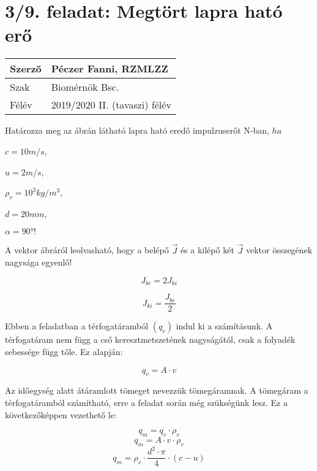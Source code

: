 \section*{3/9. feladat: Megtört lapra ható erő}
\begin{tabular}{ | p{2cm} | p{14cm} | } 
	\hline 
	Szerző & Péczer Fanni, RZMLZZ \\
	\hline
	Szak & Biomérnök Bsc. \\
	\hline	Félév & 2019/2020 II. (tavaszi) félév  \\
	\hline
\end{tabular}
\vspace{0.5cm}

\noindent Határozza meg az ábrán látható lapra ható eredő impulzuserőt N-ban, $ha$

$c= 10 m/s$,

$u= 2 m/s$,

$\rho_v=10^3 kg/m^3$,

$d=20 mm$,

$\alpha=90°!$



\noindent\hrulefill


\noindent A vektor ábráról leolvasható, hogy a belépő $\vec{J}$ és a kilépő két $\vec{J}$ vektor összegének nagysága egyenlő!

\begin{equation}
J_{be} = 2 J_{ki}
\end{equation}

\begin{equation}
J_{ki} = \frac{J_{be}}{2}
\end{equation}

\noindent Ebben a feladatban a térfogatáramból $(q_v)$ indul ki a számításunk. A térfogatáram nem függ a cső keresztmetszetének nagyságától, csak a folyadék sebessége függ tőle. Ez alapján:

\begin{equation}
q_v=A\cdot{v}
\end{equation}

\noindent Az időegység alatt átáramlott tömeget nevezzük tömegáramnak. A tömegáram a térfogatáramból számítható, erre a feladat során még szükségünk lesz. Ez a következőképpen vezethető le:

\begin{equation}
q_m=q_v\cdot{\rho_v}
\end{equation}
\begin{equation}
q_m=A\cdot{v}\cdot{\rho_v}
\end{equation}
\begin{equation}
q_m={\rho_v}\cdot{\frac{d^2\cdot{\pi}}{4}}\cdot(c-u)
\end{equation}


